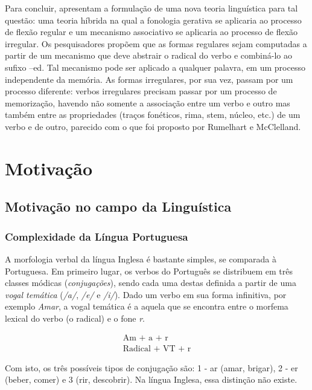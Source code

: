 Para concluir, \cite{Pinker:1988} apresentam a formulação de uma nova teoria linguística para tal questão: uma teoria híbrida na qual a fonologia gerativa se aplicaria ao processo de flexão regular e um mecanismo associativo se aplicaria ao processo de flexão irregular. Os pesquisadores propõem que as formas regulares sejam computadas a partir de um mecanismo que deve abstrair o radical do verbo e combiná-lo ao sufixo –ed.  Tal mecanismo pode ser aplicado a qualquer palavra, em um processo independente da memória. As formas irregulares, por sua vez, passam por um processo diferente: verbos irregulares precisam passar por um processo de memorização, havendo não somente a associação entre um verbo e outro mas também entre as propriedades (traços fonéticos, rima, stem, núcleo, etc.) de um verbo e de outro, parecido com o que foi proposto por Rumelhart e McClelland.

\section{Motivação}
\label{sec:motivation}

\subsection{Motivação no campo da Linguística}

\subsubsection{Complexidade da Língua Portuguesa}

A morfologia verbal da língua Inglesa é bastante simples, se comparada à Portuguesa. Em primeiro lugar, os verbos do Português se distribuem em três classes módicas (\textit{conjugações}), sendo cada uma destas definida a partir de uma \textit{vogal temática} (\textit{/a/}, \textit{/e/} e \textit{/i/}). Dado um verbo em sua forma infinitiva, por exemplo \textit{Amar}, a vogal temática é a aquela que se encontra entre o morfema lexical do verbo (o radical) e o fone \textit{r}.

\begin{align*}
    \text{Am + a + r}\\
    \text{Radical + VT + r} 
\end{align*}

Com isto, os três possíveis tipos de conjugação são: 1 - ar (amar, brigar), 2 - er (beber, comer) e 3 (rir, descobrir). Na língua Inglesa, essa distinção não existe. 


